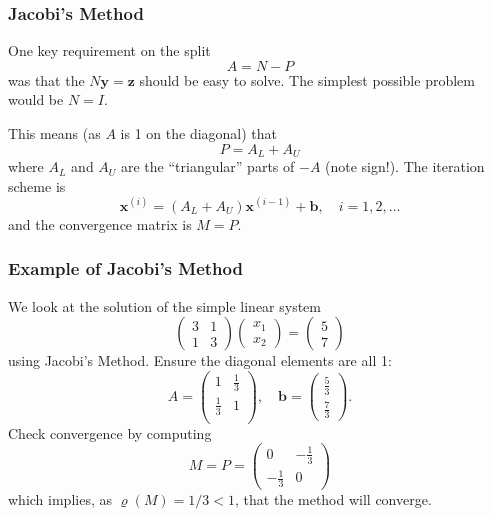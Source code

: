 \documentclass{beamer}
\newcommand{\bb}{{\boldsymbol{b}}}
\newcommand{\bx}{{\boldsymbol{x}}}
\newcommand{\bfm}[1]{{\boldsymbol{#1}}}
\begin{document}
\begin{frame}
  \frametitle{Jacobi's Method}

  One key requirement on the split
  \begin{equation*}
    A = N - P
  \end{equation*}
  was that the $N \bfm{y} = \bfm{z}$ should be easy to solve. The
  simplest possible problem would be $N = I$. \pause

  \vspace{1ex}

  This means (as $A$ is 1 on the diagonal) that
  \begin{equation*}
    P = A_L + A_U
  \end{equation*}
  where $A_L$ and $A_U$ are the ``triangular'' parts of $-A$ (note
  sign!). The iteration scheme is
  \begin{equation*}
    \bx^{(i)} =  (A_L + A_U) \bx^{(i - 1)} + \bb, \quad i = 1, 2, \dots
  \end{equation*}
  and the convergence matrix is $M = P$.

\end{frame}

\begin{frame}
  \frametitle{Example of Jacobi's Method}

  We look at the solution of the simple linear system
  \begin{equation*}
    \begin{pmatrix}
      3 & 1 \\
      1 & 3
    \end{pmatrix}
    \begin{pmatrix}
      x_1 \\ x_2
    \end{pmatrix} =
    \begin{pmatrix}
      5 \\ 7
    \end{pmatrix}
  \end{equation*}
  using Jacobi's Method. \pause  Ensure the diagonal
  elements are all 1:
  \begin{equation*}
    A =
    \begin{pmatrix}
      1 & \tfrac{1}{3} \\
      \tfrac{1}{3} & 1 \\
    \end{pmatrix},
    \quad \bb =
    \begin{pmatrix}
      \tfrac{5}{3} \\ \tfrac{7}{3}
    \end{pmatrix}.
  \end{equation*} \pause
  Check convergence by computing
  \begin{equation*}
    M = P =
    \begin{pmatrix}
      0 & -\tfrac{1}{3} \\
      -\tfrac{1}{3} & 0
    \end{pmatrix}
  \end{equation*}
  which implies, as $\varrho(M) = 1 / 3 < 1$, that the method will
  converge.

\end{frame}
\end{document}
